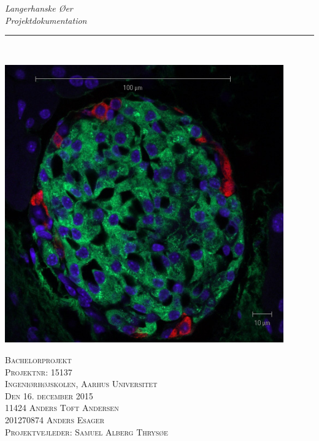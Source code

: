 \thispagestyle{empty}
\begin{center}
\vspace{3cm}

\phantom{hul}

\phantom{hul}

\phantom{hul}

\textsl{\Huge Langerhanske Øer} \\ %
\textsl{\Huge Projektdokumentation} \\ %

\rule{13cm}{3mm} \\ \vspace{1cm}

\includegraphics[width=0.9\textwidth]{billeder/forside.jpg}

\textsc{\center Bachelorprojekt \\
Projektnr: 15137 \\
Ingeniørhøjskolen, Aarhus Universitet \\
Den 16. december 2015 \\ \vspace{1cm}
11424	Anders Toft Andersen \\
201270874	Anders Esager \\
Projektvejleder: Samuel Alberg Thrysøe \\}
\end{center}
